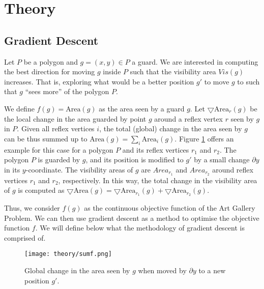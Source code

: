 \section{Theory}
\label{sec:theory}

\subsection{Gradient Descent}

Let $P$ be a polygon and $g = (x, y) \in P$ a guard. We are interested in computing the best direction for moving $g$ inside $P$ such that the visibility area $Vis(g)$ increases. That is, exploring what would be a better position $g'$ to move $g$ to such that $g$ ``sees more'' of the polygon $P$. 

We define $f(g) = \text{Area}(g)$ as the area seen by a guard $g$. Let $\bigtriangledown \text{Area}_r(g)$ be the local change in the area guarded by point $g$ around a reflex vertex $r$ seen by $g$ in $P$. Given all reflex vertices $i$, the total (global) change in the area seen by $g$ can be thus summed up to $\text{Area}(g) = \sum_i \text{Area}_i(g)$. Figure \ref{fig:sumf} offers an example for this case for a polygon $P$ and its reflex vertices $r_1$ and $r_2$. The polygon $P$ is guarded by $g$, and its position is modified to $g'$ by a small change $\partial y$ in its $y$-coordinate. The visibility areas of $g$ are $Area_{r_1}$ and $Area_{r_2}$ around reflex vertices $r_1$ and $r_2$, respectively. In this way, the total change in the visibility area of $g$ is computed as $\bigtriangledown \text{Area}(g) = \bigtriangledown \text{Area}_{r_1}(g) + \bigtriangledown \text{Area}_{r_2}(g)$.

Thus, we consider $f(g)$ as the continuous objective function of the Art Gallery Problem. We can then use gradient descent as a method to optimise the objective function $f$. We will define below what the methodology of gradient descent is comprised of.

\begin{figure}[h!]
    \centering
    \texttt{[image: theory/sumf.png]}
    \caption{Global change in the area seen by $g$ when moved by $\partial y$ to a new position $g'$.}
    \label{fig:sumf}
\end{figure}


